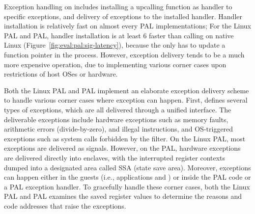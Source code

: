 



Exception handling on \thehostabi{}
includes installing a upcalling function as handler to specific exceptions,
and delivery of exceptions to the installed handler.
Handler installation
is relatively fast on almost every PAL implementations;
For the Linux PAL and \sgx{} PAL,
handler installation
is at least 6\x{} faster than calling  on native Linux (Figure~\ref{fig:eval:pal:sig-latency}),
because the \hostapi{} only has to update a function pointer in the process.
However, exception delivery
tends to be a much more expensive operation,
due to implementing various corner cases
upon restrictions
of host OSes or hardware.




Both the Linux PAL and \sgx{} PAL implement
an elaborate exception delivery scheme
to handle various corner cases where exception can happen.
First, \thehostabi{}
defines several types of exceptions,
which are all delivered through a unified interface.
The deliverable exceptions
include hardware exceptions such as memory faults,
arithmetic errors (divide-by-zero), and illegal instructions,
and OS-triggered exceptions
such as system calls forbidden by the \seccomp{} filter.
On the Linux PAL,
most exceptions are delivered as signals.
However, on the \sgx{} PAL,
hardware exceptions are delivered directly into enclaves,
with the interrupted register contexts dumped
into a designated area called SSA (state save area).
Moreover, exceptions can happen
either in the guests (i.e., applications and \liboses{})
or inside the PAL code or a PAL exception handler.
To gracefully handle these corner cases,
both the Linux PAL and \sgx{} PAL examines the saved register values to determine the reasons and code addresses
that raise the exceptions.




